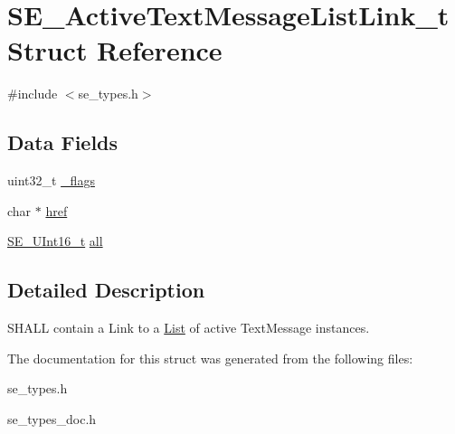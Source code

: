 \hypertarget{structSE__ActiveTextMessageListLink__t}{}\section{S\+E\+\_\+\+Active\+Text\+Message\+List\+Link\+\_\+t Struct Reference}
\label{structSE__ActiveTextMessageListLink__t}


{\ttfamily \#include $<$se\+\_\+types.\+h$>$}

\subsection*{Data Fields}
\begin{DoxyCompactItemize}
\item 
uint32\+\_\+t \hyperlink{group__ActiveTextMessageListLink_ga2bfa632d9e5fe1727367092113aafecf}{\+\_\+flags}
\item 
char $\ast$ \hyperlink{group__ActiveTextMessageListLink_gabca12a79cb2612036a2d49ec33f8fa53}{href}
\item 
\hyperlink{group__UInt16_gac68d541f189538bfd30cfaa712d20d29}{S\+E\+\_\+\+U\+Int16\+\_\+t} \hyperlink{group__ActiveTextMessageListLink_ga0fe1d2a7f428daddc9a0ca75931c144e}{all}
\end{DoxyCompactItemize}


\subsection{Detailed Description}
S\+H\+A\+LL contain a Link to a \hyperlink{structList}{List} of active Text\+Message instances. 

The documentation for this struct was generated from the following files\+:\begin{DoxyCompactItemize}
\item 
se\+\_\+types.\+h\item 
se\+\_\+types\+\_\+doc.\+h\end{DoxyCompactItemize}
